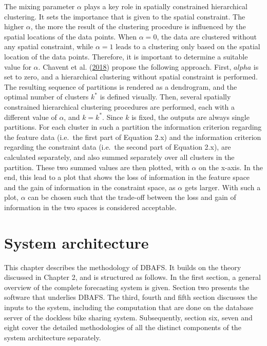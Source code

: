 \documentclass[12pt,oneside]{reedthesis}
\begin{document}
The mixing parameter \(\alpha\) plays a key role in spatially
constrained hierarchical clustering. It sets the importance that is
given to the spatial constraint. The higher \(\alpha\), the more the
result of the clustering procedure is influenced by the spatial
locations of the data points. When \(\alpha = 0\), the data are
clustered without any spatial constraint, while \(\alpha = 1\) leads to
a clustering only based on the spatial location of the data points.
Therefore, it is important to determine a suitable value for \(\alpha\).
Chavent et al. (\protect\hyperlink{ref-clustgeo}{2018}) propose the
following approach. First, \(alpha\) is set to zero, and a hierarchical
clustering without spatial constraint is performed. The resulting
sequence of partitions is rendered as a dendrogram, and the optimal
number of clusters \(k^{*}\) is defined visually. Then, several
spatially constrained hierarchical clustering procedures are performed,
each with a different value of \(\alpha\), and \(k = k^{*}\). Since
\(k\) is fixed, the outputs are always single partitions. For each
cluster in such a partition the information criterion regarding the
feature data (i.e.~the first part of Equation 2.x) and the information
criterion regarding the constraint data (i.e.~the second part of
Equation 2.x), are calculated separately, and also summed separately
over all clusters in the partition. These two summed values are then
plotted, with \(\alpha\) on the x-axis. In the end, this lead to a plot
that shows the loss of information in the feature space and the gain of
information in the constraint space, as \(\alpha\) gets larger. With
such a plot, \(\alpha\) can be chosen such that the trade-off between
the loss and gain of information in the two spaces is considered
acceptable.

\chapter{System architecture}\label{system-architecture}

This chapter describes the methodology of DBAFS. It builds on the theory
discussed in Chapter 2, and is structured as follows. In the first
section, a general overview of the complete forecasting system is given.
Section two presents the software that underlies DBAFS. The third,
fourth and fifth section discusses the inputs to the system, including
the computation that are done on the database server of the dockless
bike sharing system. Subsequently, section six, seven and eight cover
the detailed methodologies of all the distinct components of the system
architecture separately.
\end{document}

